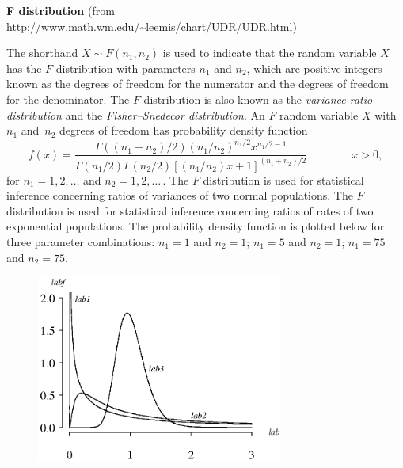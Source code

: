 \documentclass[12pt,fullpage]{article}
\begin{document}
\noindent
{\bf F distribution} (from \color{blue}\url{http://www.math.wm.edu/~leemis/chart/UDR/UDR.html}\color{black})

\noindent
The shorthand $X \sim F(n_{1},n_{2})$ is used to indicate that the
random variable $X$ has the $F$ distribution with parameters $n_{1}$ and $n_{2}$,
which are positive integers known as the degrees of freedom for the numerator and
the degrees of freedom for the denominator.
The $F$ distribution is also known as the {\it variance ratio distribution\/} and
the {\it Fisher--Snedecor distribution}.
An $F$ random variable $X$ with~$n_{1}$ and~$n_{2}$ degrees of freedom
has probability density function 
$$
f(x) = \frac{\Gamma((n_{1}+n_{2})/2)(n_{1}/n_{2})^{n_{1}/2}x^{n_{1}/2-1}}
{\Gamma(n_{1}/2)\Gamma(n_{2}/2)[(n_{1}/n_{2})x+1]^{(n_{1}+n_{2})/2}} \qquad \qquad x > 0,
$$
for $n_{1} = 1,2,\ldots$ and $n_{2} = 1,2,\ldots \,$.
The $F$ distribution is used for statistical inference concerning ratios of variances of
two normal populations.
The $F$ distribution is used for statistical inference concerning ratios of rates of two
exponential populations.
The probability density function is plotted below for three parameter combinations:
$n_1 = 1$ and $n_2 = 1$; $n_1 =  5$ and $n_2 = 1$; $n_1 = 75$ and $n_2 = 75$.

\begin{figure}[h!]
\begin{center}
\includegraphics[width=3.2in]{FPlot.ps}
\end{center}
\end{figure}
\end{document}
